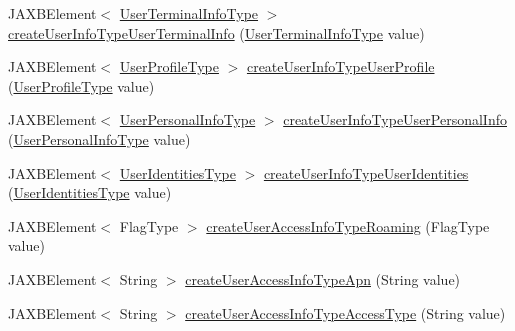 \begin{DoxyCompactItemize}
\item 
JAXBElement$<$ \hyperlink{classcom_1_1telefonica_1_1schemas_1_1unica_1_1rest_1_1directory_1_1v1_1_1UserTerminalInfoType}{UserTerminalInfoType} $>$ \hyperlink{classcom_1_1telefonica_1_1schemas_1_1unica_1_1rest_1_1directory_1_1v1_1_1ObjectFactory_a4d92edce1a60caf91a69929b7f27f071}{createUserInfoTypeUserTerminalInfo} (\hyperlink{classcom_1_1telefonica_1_1schemas_1_1unica_1_1rest_1_1directory_1_1v1_1_1UserTerminalInfoType}{UserTerminalInfoType} value)
\item 
JAXBElement$<$ \hyperlink{classcom_1_1telefonica_1_1schemas_1_1unica_1_1rest_1_1directory_1_1v1_1_1UserProfileType}{UserProfileType} $>$ \hyperlink{classcom_1_1telefonica_1_1schemas_1_1unica_1_1rest_1_1directory_1_1v1_1_1ObjectFactory_ac3db01133217e9bfaed4162f26ffcd2c}{createUserInfoTypeUserProfile} (\hyperlink{classcom_1_1telefonica_1_1schemas_1_1unica_1_1rest_1_1directory_1_1v1_1_1UserProfileType}{UserProfileType} value)
\item 
JAXBElement$<$ \hyperlink{classcom_1_1telefonica_1_1schemas_1_1unica_1_1rest_1_1directory_1_1v1_1_1UserPersonalInfoType}{UserPersonalInfoType} $>$ \hyperlink{classcom_1_1telefonica_1_1schemas_1_1unica_1_1rest_1_1directory_1_1v1_1_1ObjectFactory_a49629f417f2c5a0fc5f4cab0809f684b}{createUserInfoTypeUserPersonalInfo} (\hyperlink{classcom_1_1telefonica_1_1schemas_1_1unica_1_1rest_1_1directory_1_1v1_1_1UserPersonalInfoType}{UserPersonalInfoType} value)
\item 
JAXBElement$<$ \hyperlink{classcom_1_1telefonica_1_1schemas_1_1unica_1_1rest_1_1directory_1_1v1_1_1UserIdentitiesType}{UserIdentitiesType} $>$ \hyperlink{classcom_1_1telefonica_1_1schemas_1_1unica_1_1rest_1_1directory_1_1v1_1_1ObjectFactory_a56bcce11f4d5c15be12b0cc3def3177c}{createUserInfoTypeUserIdentities} (\hyperlink{classcom_1_1telefonica_1_1schemas_1_1unica_1_1rest_1_1directory_1_1v1_1_1UserIdentitiesType}{UserIdentitiesType} value)
\item 
JAXBElement$<$ FlagType $>$ \hyperlink{classcom_1_1telefonica_1_1schemas_1_1unica_1_1rest_1_1directory_1_1v1_1_1ObjectFactory_a789712c5eeea1cc2e8264f85fef929b0}{createUserAccessInfoTypeRoaming} (FlagType value)
\item 
JAXBElement$<$ String $>$ \hyperlink{classcom_1_1telefonica_1_1schemas_1_1unica_1_1rest_1_1directory_1_1v1_1_1ObjectFactory_a3d1aa9d5715fe809b3adcaab7e01757e}{createUserAccessInfoTypeApn} (String value)
\item 
JAXBElement$<$ String $>$ \hyperlink{classcom_1_1telefonica_1_1schemas_1_1unica_1_1rest_1_1directory_1_1v1_1_1ObjectFactory_a35b5242f37104043e5f7c341a9a841e3}{createUserAccessInfoTypeAccessType} (String value)

\end{DoxyCompactItemize}
